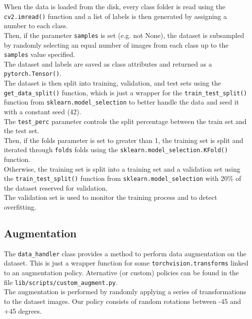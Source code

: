 \documentclass{report}
\begin{document}
When the data is loaded from the disk, every class folder is read using the \texttt{cv2.imread()} function and a list of labels is then generated by assigning a number to each class. \\
Then, if the parameter \texttt{samples} is set (e.g. not None), the dataset is subsampled by randomly selecting an equal number of images from each class up to the \texttt{samples} value specified. \\
The dataset and labels are saved as class attributes and returned as a \texttt{pytorch.Tensor()}.\\

The dataset is then split into training, validation, and test sets using the \texttt{get\_data\_split()} function, which is just a wrapper for the \texttt{train\_test\_split()} function from \texttt{sklearn.model\_selection} to 
better handle the data and seed it with a constant seed (42). \\
The \texttt{test\_perc} parameter controls the split percentage between the train set and the test set. \\

Then, if the folds parameter is set to greater than 1, the training set is split and iterated through \texttt{folds} folds using the \texttt{sklearn.model\_selection.KFold()} function. \\
Otherwise, the training set is split into a training set and a validation set using the \texttt{train\_test\_split()} function from \texttt{sklearn.model\_selection} with 20\% of the dataset reserved for validation. \\
The validation set is used to monitor the training process and to detect overfitting. \\

\subsection{Augmentation}
The \texttt{data\_handler} class provides a method to perform data augmentation on the dataset. This is just a wrapper function for some \texttt{torchvision.transforms} 
linked to an augmentation policy. Aternative (or custom) policies can be found in the file \texttt{lib/scripts/custom\_augment.py}. \\

The augmentation is performed by randomly applying a series of transformations to the dataset images. Our policy consists of random rotations between -45 and +45 degrees.\\
\end{document}
